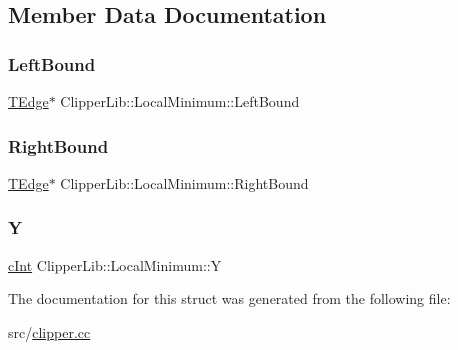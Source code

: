 \subsection{Member Data Documentation}
\mbox{\label{struct_clipper_lib_1_1_local_minimum_a0e7b997adca472b6e80f3223c45965ea}} 
\subsubsection{\texorpdfstring{LeftBound}{LeftBound}}
{\footnotesize\ttfamily \mbox{\hyperlink{struct_clipper_lib_1_1_t_edge}{T\+Edge}}$\ast$ Clipper\+Lib\+::\+Local\+Minimum\+::\+Left\+Bound}

\mbox{\label{struct_clipper_lib_1_1_local_minimum_ade212cfb8c35da168b2bf20ad3e0ac94}} 
\subsubsection{\texorpdfstring{RightBound}{RightBound}}
{\footnotesize\ttfamily \mbox{\hyperlink{struct_clipper_lib_1_1_t_edge}{T\+Edge}}$\ast$ Clipper\+Lib\+::\+Local\+Minimum\+::\+Right\+Bound}

\mbox{\label{struct_clipper_lib_1_1_local_minimum_a71836a7c572ddfcf8853accb7314b7cf}} 
\subsubsection{\texorpdfstring{Y}{Y}}
{\footnotesize\ttfamily \mbox{\hyperlink{namespace_clipper_lib_a7156730a24951629192d4831334bafaa}{c\+Int}} Clipper\+Lib\+::\+Local\+Minimum\+::Y}



The documentation for this struct was generated from the following file\+:\begin{DoxyCompactItemize}
\item 
src/\mbox{\hyperlink{clipper_8cc}{clipper.\+cc}}\end{DoxyCompactItemize}
